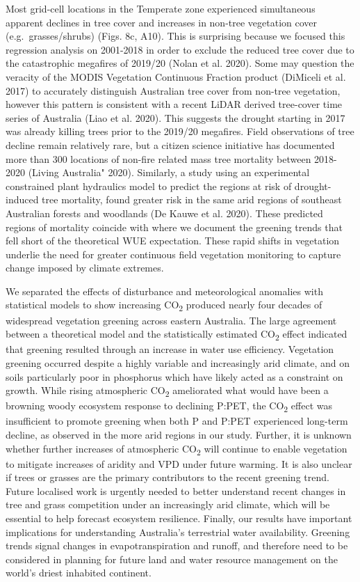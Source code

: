 \documentclass[
]{article}
\begin{document}
Most grid-cell locations in the Temperate zone experienced simultaneous
apparent declines in tree cover and increases in non-tree vegetation
cover (e.g.~grasses/shrubs) (Figs. 8c, A10). This is surprising because
we focused this regression analysis on 2001-2018 in order to exclude the
reduced tree cover due to the catastrophic megafires of 2019/20 (Nolan
et al. 2020). Some may question the veracity of the MODIS Vegetation
Continuous Fraction product (DiMiceli et al. 2017) to accurately
distinguish Australian tree cover from non-tree vegetation, however this
pattern is consistent with a recent LiDAR derived tree-cover time series
of Australia (Liao et al. 2020). This suggests the drought starting in
2017 was already killing trees prior to the 2019/20 megafires. Field
observations of tree decline remain relatively rare, but a citizen
science initiative has documented more than 300 locations of non-fire
related mass tree mortality between 2018-2020 (Living Australia" 2020).
Similarly, a study using an experimental constrained plant hydraulics
model to predict the regions at risk of drought-induced tree mortality,
found greater risk in the same arid regions of southeast Australian
forests and woodlands (De Kauwe et al. 2020). These predicted regions of
mortality coincide with where we document the greening trends that fell
short of the theoretical WUE expectation. These rapid shifts in
vegetation underlie the need for greater continuous field vegetation
monitoring to capture change imposed by climate extremes.

\conclusions[Conclusions]We separated the effects of disturbance and
meteorological anomalies with statistical models to show increasing
CO\textsubscript{2} produced nearly four decades of widespread
vegetation greening across eastern Australia. The large agreement
between a theoretical model and the statistically estimated
CO\textsubscript{2} effect indicated that greening resulted through an
increase in water use efficiency. Vegetation greening occurred despite a
highly variable and increasingly arid climate, and on soils particularly
poor in phosphorus which have likely acted as a constraint on growth.
While rising atmospheric CO\textsubscript{2} ameliorated what would have
been a browning woody ecosystem response to declining P:PET, the
CO\textsubscript{2} effect was insufficient to promote greening when
both P and P:PET experienced long-term decline, as observed in the more
arid regions in our study. Further, it is unknown whether further
increases of atmospheric CO\textsubscript{2} will continue to enable
vegetation to mitigate increases of aridity and VPD under future
warming. It is also unclear if trees or grasses are the primary
contributors to the recent greening trend. Future localised work is
urgently needed to better understand recent changes in tree and grass
competition under an increasingly arid climate, which will be essential
to help forecast ecosystem resilience. Finally, our results have
important implications for understanding Australia's terrestrial water
availability. Greening trends signal changes in evapotranspiration and
runoff, and therefore need to be considered in planning for future land
and water resource management on the world's driest inhabited continent.
\end{document}
